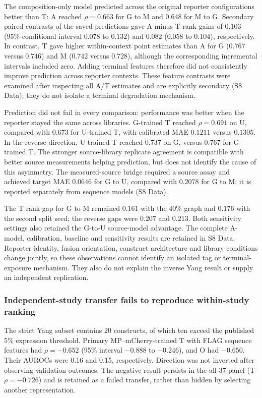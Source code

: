 \documentclass[11pt,a4paper]{article}
\begin{document}
The composition-only model predicted across the original reporter configurations better than T: A reached $\rho=0.663$ for G to M and $0.648$ for M to G.
Secondary paired contrasts of the saved predictions gave A-minus-T rank
gains of $0.103$ (95\% conditional interval $0.078$ to $0.132$) and
$0.082$ ($0.058$ to $0.104$), respectively. In contrast, T gave higher
within-context point estimates than A for G ($0.767$ versus $0.746$) and
M ($0.742$ versus $0.728$), although the corresponding incremental intervals
included zero. Adding terminal features therefore did not consistently improve prediction across reporter contexts. These feature contrasts were examined after inspecting all A/T
estimates and are explicitly secondary (S8 Data); they do not isolate a
terminal degradation mechanism.



Prediction did not fail in every comparison: performance was better when the reporter stayed the same across libraries. G-trained T reached $\rho=0.691$ on U,
compared with $0.673$ for U-trained T, with calibrated MAE $0.1211$ versus
$0.1305$. In the reverse direction, U-trained T reached $0.737$ on G,
versus $0.767$ for G-trained T. The stronger source-library replicate
agreement is compatible with better source measurements helping prediction,
but does not identify the cause of this asymmetry. The measured-source
bridge required a source assay and achieved target MAE $0.0646$ for G to U,
compared with $0.2078$ for G to M; it is reported separately from sequence
models (S8 Data).

The T rank gap for G to M remained $0.161$ with the 40\% graph and $0.176$
with the second split seed; the reverse gaps were $0.207$ and $0.213$.
Both sensitivity settings also retained the G-to-U source-model advantage.
The complete A-model, calibration, baseline and sensitivity results are
retained in S8 Data. Reporter identity, fusion orientation, construct
architecture and library conditions change jointly, so these observations
cannot identify an isolated tag or terminal-exposure mechanism. They also
do not explain the inverse Yang result or supply an independent replication.

\subsubsection{Independent-study transfer fails to reproduce within-study ranking}
The strict Yang subset contains 20 constructs, of which ten exceed the
published 5\% expression threshold. Primary MP--mCherry-trained T with FLAG
sequence features had $\rho=-0.652$ (95\% interval $-0.888$ to $-0.246$),
and O had $-0.650$. Their AUROCs were 0.16 and 0.15, respectively. Direction
was not inverted after observing validation outcomes. The negative result
persists in the all-37 panel (T $\rho=-0.726$) and is retained as a failed
transfer, rather than hidden by selecting another representation.
\end{document}
